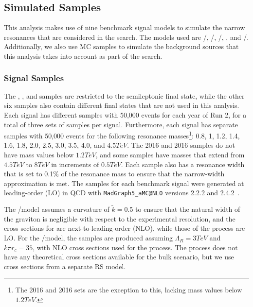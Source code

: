 \subsection{Simulated Samples}
\label{sec:simSamples}

This analysis makes use of nine benchmark signal models to simulate the narrow resonances that are considered in the search.
The models used are \ggF/\VBF\GBulktoWWtolnuqqbarpr, \ggF/\VBF\RadtoWWtolnuqqbarpr, \DY/\VBF\WprtoWZtolnuqqbar, \DY\WprtoWHtolnubbbar, and \DY/\VBF\ZprtoWWtolnuqqbarpr.
Additionally, we also use MC samples to simulate the background sources that this analysis takes into account as part of the search.

\subsubsection{Signal Samples}

The \DY\WprtoWH, \DY\WprtoWZ, and \ggF\GBulktoWW samples are restricted to the semileptonic final state, while the other six samples also contain different final states that are not used in this analysis.
Each signal has different samples with 50,000 events for each year of Run 2, for a total of three sets of samples per signal.
Furthermore, each signal has separate samples with 50,000 events for the following resonance masses\footnote{The 2016 \VBF\ZprtoWW and 2016 \VBF\WprtoWZ sets are the exception to this, lacking mass values below $1.2\unit{TeV}$.}: 0.8, 1, 1.2, 1.4, 1.6, 1.8, 2.0, 2.5, 3.0, 3.5, 4.0, and $4.5\unit{TeV}$.
The 2016 \VBF\ZprtoWW and 2016 \VBF\WprtoWZ samples do not have mass values below $1.2\unit{TeV}$, and some samples have masses that extend from $4.5\unit{TeV}$ to $8\unit{TeV}$ in increments of $0.5\unit{TeV}$.
Each sample also has a resonance width that is set to 0.1\% of the resonance mass to ensure that the narrow-width approximation is met.
The samples for each benchmark signal were generated at leading-order (LO) in QCD with \texttt{MadGraph5\_aMC@NLO} versions 2.2.2 and 2.4.2~\cite{Alwall_2014}.

The \ggF/\VBF\GBulktoWW model assumes a curvature of $\tilde{k}=0.5$ to ensure that the natural width of the graviton is negligible with respect to the experimental resolution, and the cross sections for \ggF\GBulktoWW are next-to-leading-order (NLO), while those of the \VBF process are LO.
For the \ggF/\VBF\RadtoWW model, the samples are produced assuming $\Lambda_{R}=3\unit{TeV}$ and $k\pi r_c=35$, with NLO cross sections used for the \ggF process.
The \VBF process does not have any theoretical cross sections available for the bulk scenario, but we use cross sections from a separate RS model.

